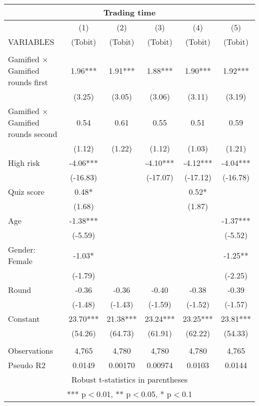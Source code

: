 \documentclass[]{article}
\begin{document}
\begin{tabular}{lccccc}
\multicolumn{6}{c}{Trading time} \\ \hline
 & (1) & (2) & (3) & (4) & (5) \\
VARIABLES & (Tobit) & (Tobit) & (Tobit) & (Tobit) & (Tobit) \\ \hline
 &  &  &  &  &  \\
Gamified $\times$ Gamified rounds first & 1.96*** & 1.91*** & 1.88*** & 1.90*** & 1.92*** \\
 & (3.25) & (3.05) & (3.06) & (3.11) & (3.19) \\
Gamified $\times$ Gamified rounds second & 0.54 & 0.61 & 0.55 & 0.51 & 0.59 \\
 & (1.12) & (1.22) & (1.12) & (1.03) & (1.21) \\
High risk & -4.06*** &  & -4.10*** & -4.12*** & -4.04*** \\
 & (-16.83) &  & (-17.07) & (-17.12) & (-16.78) \\
Quiz score & 0.48* &  &  & 0.52* &  \\
 & (1.68) &  &  & (1.87) &  \\
Age & -1.38*** &  &  &  & -1.37*** \\
 & (-5.59) &  &  &  & (-5.52) \\
Gender: Female & -1.03* &  &  &  & -1.25** \\
 & (-1.79) &  &  &  & (-2.25) \\
Round & -0.36 & -0.36 & -0.40 & -0.38 & -0.39 \\
 & (-1.48) & (-1.43) & (-1.59) & (-1.52) & (-1.57) \\
Constant & 23.70*** & 21.38*** & 23.24*** & 23.25*** & 23.81*** \\
 & (54.26) & (64.73) & (61.91) & (62.22) & (54.33) \\
 &  &  &  &  &  \\
Observations & 4,765 & 4,780 & 4,780 & 4,780 & 4,765 \\
 Pseudo R2 & 0.0149 & 0.00170 & 0.00974 & 0.0103 & 0.0144 \\ \hline
\multicolumn{6}{c}{ Robust t-statistics in parentheses} \\
\multicolumn{6}{c}{ *** p$<$0.01, ** p$<$0.05, * p$<$0.1} \\
\end{tabular}
\end{document}
